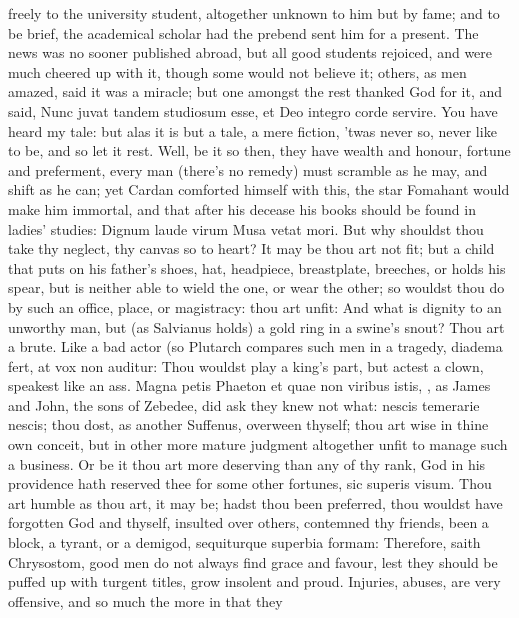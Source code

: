 {freely to the university student, altogether unknown to him but by
fame; and to be brief, the academical scholar had the prebend sent him
for a present. The news was no sooner published abroad, but all good
students rejoiced, and were much cheered up with it, though some would
not believe it; others, as men amazed, said it was a miracle; but one
amongst the rest thanked God for it, and said, Nunc juvat tandem
studiosum esse, et Deo integro corde servire. You have heard my tale:
but alas it is but a tale, a mere fiction, 'twas never so, never like
to be, and so let it rest. Well, be it so then, they have wealth and
honour, fortune and preferment, every man (there's no remedy) must
scramble as he may, and shift as he can; yet Cardan comforted himself
with this, the star Fomahant would make him immortal, and that
after his decease his books should be found in ladies' studies:
Dignum laude virum Musa vetat mori. But why shouldst thou take
thy neglect, thy canvas so to heart? It may be thou art not fit; but a
child that puts on his father's shoes, hat, headpiece,
breastplate, breeches, or holds his spear, but is neither able to wield
the one, or wear the other; so wouldst thou do by such an office,
place, or magistracy: thou art unfit: And what is dignity to an
unworthy man, but (as  Salvianus holds) a gold ring in a swine's
snout? Thou art a brute. Like a bad actor (so Plutarch compares
such men in a tragedy, diadema fert, at vox non auditur: Thou wouldst
play a king's part, but actest a clown, speakest like an ass.
Magna petis Phaeton et quae non viribus istis, \etc{}, as James and
John, the sons of Zebedee, did ask they knew not what: nescis temerarie
nescis; thou dost, as another Suffenus, overween thyself; thou art wise
in thine own conceit, but in other more mature judgment altogether
unfit to manage such a business. Or be it thou art more deserving than
any of thy rank, God in his providence hath reserved thee for some
other fortunes, sic superis visum. Thou art humble as thou art, it may
be; hadst thou been preferred, thou wouldst have forgotten God and
thyself, insulted over others, contemned thy friends, been a
block, a tyrant, or a demigod, sequiturque superbia formam:
Therefore, saith Chrysostom, good men do not always find grace
and favour, lest they should be puffed up with turgent titles, grow
insolent and proud.
Injuries, abuses, are very offensive, and so much the more in that they
}
